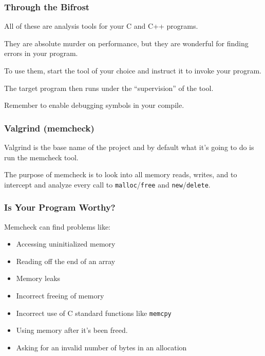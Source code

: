 \begin{frame}
\frametitle{Through the Bifrost}

All of these are analysis tools for your C and C++ programs. 

They are absolute murder on performance, but they are wonderful for finding errors in your program. 

To use them, start the tool of your choice and instruct it to invoke your program. 

The target program then runs under the ``supervision'' of the tool.

Remember to enable debugging symbols in your compile.

\end{frame}

\begin{frame}
\frametitle{Valgrind (memcheck)}

Valgrind is the base name of the project and by default what it's going to do is run the memcheck tool. 

The purpose of memcheck is to look into all memory reads, writes, and to intercept and analyze every call to \texttt{malloc}/\texttt{free} and \texttt{new}/\texttt{delete}.

\end{frame}

\begin{frame}
\frametitle{Is Your Program Worthy?}

Memcheck can find problems like:
\begin{itemize}
	\item Accessing uninitialized memory
	\item Reading off the end of an array
	\item Memory leaks
	\item Incorrect freeing of memory
	\item Incorrect use of C standard functions like \texttt{memcpy}
	\item Using memory after it's been freed.
	\item Asking for an invalid number of bytes in an allocation
\end{itemize}

\end{frame}

